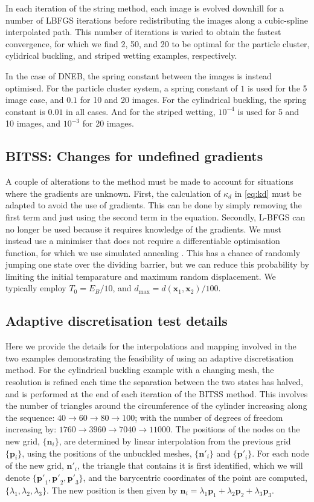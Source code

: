 \documentclass[twocolumn,10pt]{revtex4}
\begin{document}
In each iteration of the string method, each image is evolved downhill for a number of LBFGS iterations before redistributing the images along a cubic-spline interpolated path.
This number of iterations is varied to obtain the fastest convergence, for which we find 2, 50, and 20 to be optimal for the particle cluster, cylidrical buckling, and striped wetting examples, respectively.

In the case of DNEB, the spring constant between the images is instead optimised.
For the particle cluster system, a spring constant of $1$ is used for the 5 image case, and $0.1$ for 10 and 20 images.
For the cylindrical buckling, the spring constant is $0.01$ in all cases.
And for the striped wetting, $10^{-4}$ is used for 5 and 10 images, and $10^{-3}$ for 20 images.

\subsection{BITSS: Changes for undefined gradients}
A couple of alterations to the method must be made to account for situations where the gradients are unknown.
First, the calculation of $\kappa_d$ in \cref{eq:kd} must be adapted to avoid the use of gradients.
This can be done by simply removing the first term and just using the second term in the equation.
Secondly, L-BFGS can no longer be used because it requires knowledge of the gradients.
We must instead use a minimiser that does not require a differentiable optimisation function, for which we use simulated annealing \cite{Kirkpatrick1983}.
This has a chance of randomly jumping one state over the dividing barrier, but we can reduce this probability by limiting the initial temparature and maximum random displacement.
We typically employ $T_0 = E_B / 10$, and $d_\text{max} = d(\bm{x}_1, \bm{x}_2) / 100$.

\subsection{Adaptive discretisation test details}
Here we provide the details for the interpolations and mapping involved in the two examples demonstrating the feasibility of using an adaptive discretisation method.
For the cylindrical buckling example with a changing mesh, the resolution is refined each time the separation between the two states has halved, and is performed at the end of each iteration of the BITSS method.
This involves the number of triangles around the circumference of the cylinder increasing along the sequence: $40 \rightarrow 60 \rightarrow 80 \rightarrow 100$; with the number of degrees of freedom increasing by: $1760 \rightarrow 3960 \rightarrow 7040 \rightarrow 11000$.
The positions of the nodes on the new grid, $\{\bm{n}_i\}$, are determined by linear interpolation from the previous grid $\{\bm{p}_i\}$, using the positions of the unbuckled meshes, $\{\bm{n'}_i\}$ and $\{\bm{p'}_i\}$.
For each node of the new grid, $\bm{n'}_i$, the triangle that contains it is first identified, which we will denote $\{\bm{p'}_1,\bm{p'}_2,\bm{p'}_3\}$, and the barycentric coordinates of the point are computed, $\{\lambda_1,\lambda_2,\lambda_3\}$.
The new position is then given by $\bm{n}_i = \lambda_1 \bm{p}_1 + \lambda_2 \bm{p}_2 + \lambda_3 \bm{p}_3$.
\end{document}
